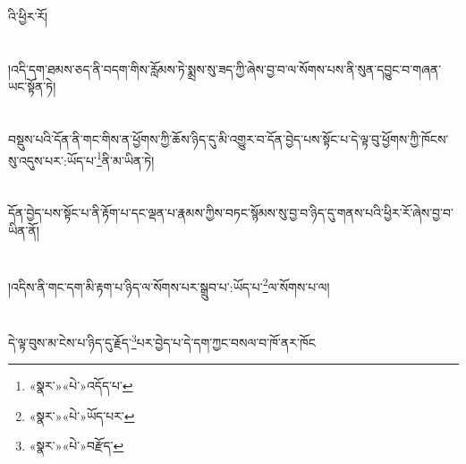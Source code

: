འི་ཕྱིར་རོ།\chapter{ }།འདི་དག་ཐམས་ཅད་ནི་བདག་གིས་རློམས་ཏེ་སྨྲས་སུ་ཟད་ཀྱི་ཞེས་བྱ་བ་ལ་སོགས་པས་ནི་སུན་དབྱུང་བ་གཞན་ཡང་སྟོན་ཏེ།\chapter{ }བསྡུས་པའི་དོན་ནི་གང་གིས་ན་ཕྱོགས་ཀྱི་ཆོས་ཉིད་དུ་མི་འགྱུར་བ་དོན་བྱེད་པས་སྟོང་པ་དེ་ལྟ་བུ་ཕྱོགས་ཀྱི་ཁོངས་སུ་འདུས་པར་:ཡོད་པ་\footnote{«སྣར་»«པེ་»འདོད་པ་}ནི་མ་ཡིན་ཏེ།\chapter{ }དོན་བྱེད་པས་སྟོང་པ་ནི་རྟོག་པ་དང་ལྡན་པ་རྣམས་ཀྱིས་བཏང་སྙོམས་སུ་བྱ་བ་ཉིད་དུ་གནས་པའི་ཕྱིར་རོ་ཞེས་བྱ་བ་ཡིན་ནོ།\chapter{ }།འདིས་ནི་གང་དག་མི་རྟག་པ་ཉིད་ལ་སོགས་པར་སྒྲུབ་པ་:ཡོད་པ་\footnote{«སྣར་»«པེ་»ཡོད་པར་}ལ་སོགས་པ་ལ།\chapter{ }དེ་ལྟ་བུས་མ་ངེས་པ་ཉིད་དུ་རྗོད་\footnote{«སྣར་»«པེ་»བརྫོད་}པར་བྱེད་པ་དེ་དག་ཀྱང་བསལ་བ་ཁོ་ནར་ཁོང